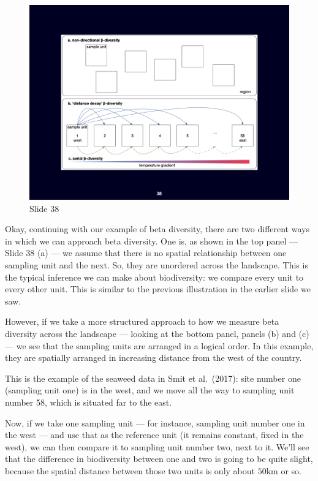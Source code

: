 \documentclass[
  12pt,
]{book}
\begin{document}
\begin{figure}[ht]
\centering
\includegraphics[width=0.8\linewidth]{../images/BDC334/BDC334-038.jpeg}
\caption*{Slide 38}
\end{figure}

Okay, continuing with our example of beta diversity, there are two
different ways in which we can approach beta diversity. One is, as shown
in the top panel --- Slide 38 (a) --- we assume that there is no spatial
relationship between one sampling unit and the next. So, they are
unordered across the landscape. This is the typical inference we can
make about biodiversity: we compare every unit to every other unit. This
is similar to the previous illustration in the earlier slide we saw.

However, if we take a more structured approach to how we measure beta
diversity across the landscape --- looking at the bottom panel, panels
(b) and (c) --- we see that the sampling units are arranged in a logical
order. In this example, they are spatially arranged in increasing
distance from the west of the country.

This is the example of the seaweed data in Smit et al.~(2017): site
number one (sampling unit one) is in the west, and we move all the way
to sampling unit number 58, which is situated far to the east.

Now, if we take one sampling unit --- for instance, sampling unit number
one in the west --- and use that as the reference unit (it remains
constant, fixed in the west), we can then compare it to sampling unit
number two, next to it. We'll see that the difference in biodiversity
between one and two is going to be quite slight, because the spatial
distance between those two units is only about \(50\mathrm{km}\) or so.
\end{document}
